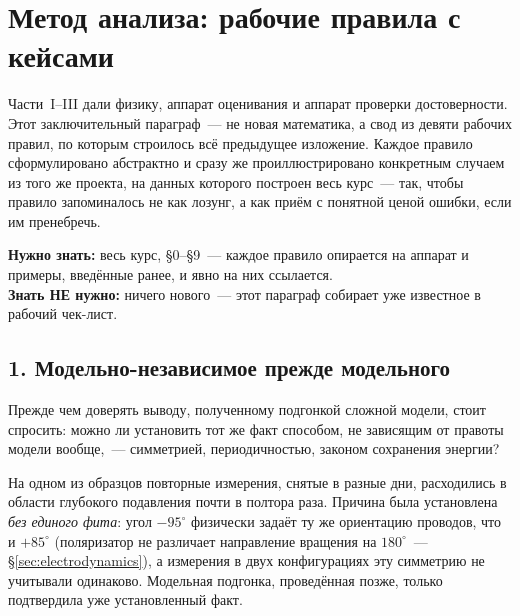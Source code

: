 %
%
\section{Метод анализа: рабочие правила с кейсами}
\label{sec:method}

Части~I--III дали физику, аппарат оценивания и аппарат проверки достоверности. Этот заключительный
параграф~--- не новая математика, а свод из девяти рабочих правил, по которым строилось всё
предыдущее изложение. Каждое правило сформулировано абстрактно и сразу же проиллюстрировано
конкретным случаем из того же проекта, на данных которого построен весь курс~--- так, чтобы правило
запоминалось не как лозунг, а как приём с понятной ценой ошибки, если им пренебречь.

\begin{tcolorbox}[enhanced,colback=cPanel,colframe=cGrid,boxrule=0.8pt,arc=2pt,
                  title={\bfseries\color{cAccent} Пререквизиты},coltitle=cAccent,
                  attach boxed title to top left={xshift=6pt,yshift=-2pt},
                  boxed title style={colback=cPanel,boxrule=0pt,arc=0pt},top=10pt]
\textbf{Нужно знать:} весь курс, §0--§9~--- каждое правило опирается на аппарат и примеры,
введённые ранее, и явно на них ссылается.\\[0.3em]
\textbf{Знать НЕ нужно:} ничего нового~--- этот параграф собирает уже известное в рабочий
чек-лист.
\end{tcolorbox}

\subsection{1. Модельно-независимое прежде модельного}
\label{subsec:rule1}

Прежде чем доверять выводу, полученному подгонкой сложной модели, стоит спросить: можно ли
установить тот же факт способом, не зависящим от правоты модели вообще,~--- симметрией,
периодичностью, законом сохранения энергии?

\begin{example}
На одном из образцов повторные измерения, снятые в разные дни, расходились в области глубокого
подавления почти в полтора раза. Причина была установлена \emph{без единого фита}: угол $-95^\circ$
физически задаёт ту же ориентацию проводов, что и $+85^\circ$ (поляризатор не различает
направление вращения на $180^\circ$~--- §\ref{sec:electrodynamics}), а измерения в двух
конфигурациях эту симметрию не учитывали одинаково. Модельная подгонка, проведённая позже,
только подтвердила уже установленный факт.
\end{example}

